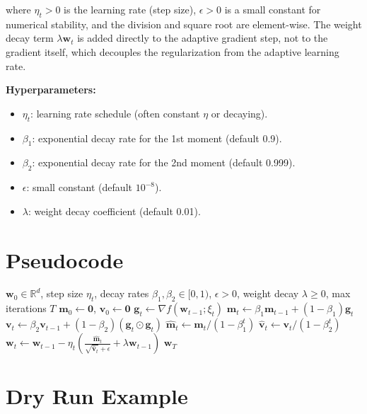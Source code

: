 \documentclass{article}
\theoremstyle{plain}
\theoremstyle{definition}
\renewcommand{\vec}[1]{\boldsymbol{#1}}
\newcommand{\R}{\mathbb{R}}
\begin{document}
where $\eta_t > 0$ is the learning rate (step size), $\epsilon > 0$ is a small constant for numerical stability, and the division and square root are element-wise. The weight decay term $\lambda \vec{w}_t$ is added directly to the adaptive gradient step, not to the gradient itself, which decouples the regularization from the adaptive learning rate.

\textbf{Hyperparameters:}
\begin{itemize}
    \item $\eta_t$: learning rate schedule (often constant $\eta$ or decaying).
    \item $\beta_1$: exponential decay rate for the 1st moment (default 0.9).
    \item $\beta_2$: exponential decay rate for the 2nd moment (default 0.999).
    \item $\epsilon$: small constant (default $10^{-8}$).
    \item $\lambda$: weight decay coefficient (default 0.01).
\end{itemize}

\section*{Pseudocode}

\begin{algorithm}[H]
\caption{AdamW}
\begin{algorithmic}[1]
\Require $\vec{w}_0 \in \R^d$, step size $\eta_t$, decay rates $\beta_1, \beta_2 \in [0,1)$, $\epsilon > 0$, weight decay $\lambda \ge 0$, max iterations $T$
\State $\vec{m}_0 \gets \vec{0}$, $\vec{v}_0 \gets \vec{0}$
    \State $\vec{g}_t \gets \nabla f(\vec{w}_{t-1}; \xi_t)$ 
    \State $\vec{m}_t \gets \beta_1 \vec{m}_{t-1} + (1 - \beta_1) \vec{g}_t$
    \State $\vec{v}_t \gets \beta_2 \vec{v}_{t-1} + (1 - \beta_2) (\vec{g}_t \odot \vec{g}_t)$
    \State $\hat{\vec{m}}_t \gets \vec{m}_t / (1 - \beta_1^t)$
    \State $\hat{\vec{v}}_t \gets \vec{v}_t / (1 - \beta_2^t)$
    \State $\vec{w}_t \gets \vec{w}_{t-1} - \eta_t \left( \frac{\hat{\vec{m}}_t}{\sqrt{\hat{\vec{v}}_t} + \epsilon} + \lambda \vec{w}_{t-1} \right)$
\EndFor
\State \Return $\vec{w}_T$
\end{algorithmic}
\end{algorithm}

\section*{Dry Run Example}
\end{document}
